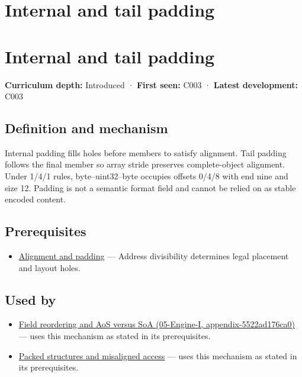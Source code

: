 \hypertarget{appendix-f52f8c5a3afd}{}
\section*{Internal and tail padding}
\section{Internal and tail padding}\label{appendix-f52f8c5a3afd-internal-and-tail-padding}

\textbf{Curriculum depth:} Introduced · \textbf{First seen:} C003 · \textbf{Latest development:} C003

\subsection{Definition and mechanism}\label{appendix-f52f8c5a3afd-definition-and-mechanism}

Internal padding fills holes before members to satisfy alignment. Tail padding follows the final member so array stride preserves complete-object alignment. Under 1/4/1 rules, byte--uint32--byte occupies offsets 0/4/8 with end nine and size 12. Padding is not a semantic format field and cannot be relied on as stable encoded content.

\subsection{Prerequisites}\label{appendix-f52f8c5a3afd-prerequisites}

\begin{itemize}
\tightlist
\item
  \hyperref[appendix-a1f7c53b4742]{Alignment and padding} --- Address divisibility determines legal placement and layout holes.
\end{itemize}

\subsection{Used by}\label{appendix-f52f8c5a3afd-used-by}

\begin{itemize}
\tightlist
\item
  \href{../05-Engine-I/main.pdf\#nameddest=appendix-5522ad176ca0}{Field reordering and AoS versus SoA (05-Engine-I, appendix-5522ad176ca0)} --- uses this mechanism as stated in its prerequisites.
\item
  \hyperref[appendix-0682dbfc5f0e]{Packed structures and misaligned access} --- uses this mechanism as stated in its prerequisites.
\end{itemize}

